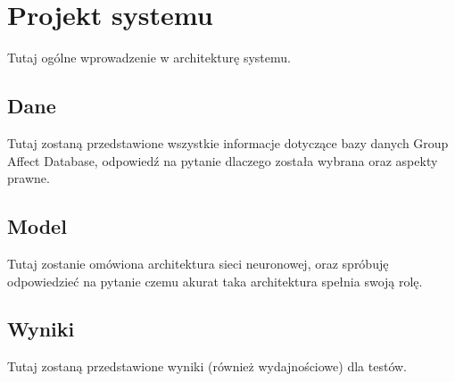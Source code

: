 \chapter{Projekt systemu}
\thispagestyle{chapterBeginStyle}

Tutaj ogólne wprowadzenie w architekturę systemu.


\section{Dane}
Tutaj zostaną przedstawione wszystkie informacje dotyczące bazy danych Group Affect Database, odpowiedź na pytanie dlaczego została wybrana oraz aspekty prawne.

\section{Model}
Tutaj zostanie omówiona architektura sieci neuronowej, oraz spróbuję odpowiedzieć na pytanie czemu akurat taka architektura spełnia swoją rolę.

\section{Wyniki}
Tutaj zostaną przedstawione wyniki (również wydajnościowe) dla testów.





